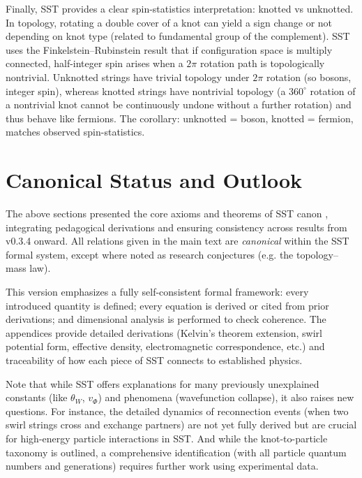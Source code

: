 \documentclass[reprint,aps,onecolumn,nofootinbib]{revtex4-2}
\begin{document}
	Finally, SST provides a clear spin-statistics interpretation: knotted vs unknotted. In topology, rotating a double cover of a knot can yield a sign change or not depending on knot type (related to fundamental group of the complement). SST uses the Finkelstein–Rubinstein result that if configuration space is multiply connected, half-integer spin arises when a $2\pi$ rotation path is topologically nontrivial. Unknotted strings have trivial topology under $2\pi$ rotation (so bosons, integer spin), whereas knotted strings have nontrivial topology (a $360^\circ$ rotation of a nontrivial knot cannot be continuously undone without a further rotation) and thus behave like fermions. The corollary: unknotted = boson, knotted = fermion, matches observed spin-statistics.



	\section{Canonical Status and Outlook}
	The above sections presented the core axioms and theorems of SST canon \canonversion, integrating pedagogical derivations and ensuring consistency across results from v0.3.4 onward. All relations given in the main text are \emph{canonical} within the SST formal system, except where noted as research conjectures (e.g. the topology–mass law).

	This version emphasizes a fully self-consistent formal framework: every introduced quantity is defined; every equation is derived or cited from prior derivations; and dimensional analysis is performed to check coherence. The appendices provide detailed derivations (Kelvin’s theorem extension, swirl potential form, effective density, electromagnetic correspondence, etc.) and traceability of how each piece of SST connects to established physics.

	Note that while SST offers explanations for many previously unexplained constants (like $\theta_W$, $v_{\Phi}$) and phenomena (wavefunction collapse), it also raises new questions. For instance, the detailed dynamics of reconnection events (when two swirl strings cross and exchange partners) are not yet fully derived but are crucial for high-energy particle interactions in SST. And while the knot-to-particle taxonomy is outlined, a comprehensive identification (with all particle quantum numbers and generations) requires further work using experimental data.
\end{document}
